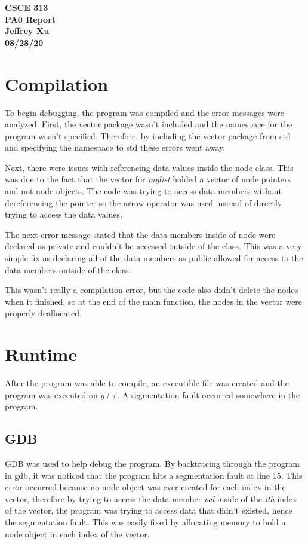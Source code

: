 \documentclass[12pt]{article}
\begin{document}
\begin{center}

{\bf
CSCE 313\\
PA0 Report\\
Jeffrey Xu\\
08/28/20\\
}

\end{center}

\section{Compilation}

To begin debugging, the program was compiled and the error messages were analyzed. First, the vector package wasn't included and the namespace for the program wasn't specified. Therefore, by including the vector package from std and specifying the namespace to std these errors went away. 

Next, there were issues with referencing data values inside the node class. This was due to the fact that the vector for \emph{mylist} holded a vector of node pointers and not node objects. The code was trying to access data members without dereferencing the pointer so the arrow operator was used instead of directly trying to access the data values. 

The next error message stated that the data members inside of node were declared as private and couldn't be accessed outside of the class. This was a very simple fix as declaring all of the data members as public allowed for access to the data members outside of the class. 

This wasn't really a compilation error, but the code also didn't delete the nodes when it finished, so at the end of the main function, the nodes in the vector were properly deallocated. 

\section{Runtime}

After the program was able to compile, an executible file was created and the program was executed on \emph{g++}. A segmentation fault occurred somewhere in the program. 

\subsection{GDB}
GDB was used to help debug the program. By backtracing through the program in gdb, it was noticed that the program hits a segmentation fault at line 15. This error occurred because no node object was ever created for each index in the vector, therefore by trying to access the data member \emph{val} inside of the \emph{ith} index of the vector, the program was trying to access data that didn't existed, hence the segmentation fault. This was easily fixed by allocating memory to hold a node object in each index of the vector. 
\end{document}
